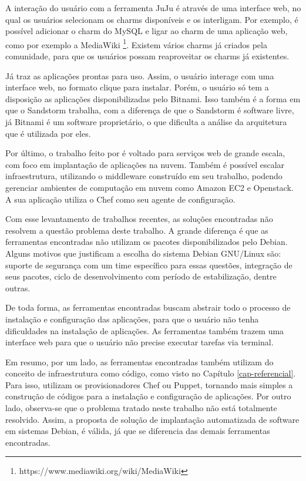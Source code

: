 A interação do usuário com a ferramenta JuJu é através de uma interface web, 
no qual os usuários selecionam os charms disponíveis e os interligam. 
Por exemplo, é possível adicionar o charm do MySQL e ligar ao charm de uma aplicação
web, como por exemplo a MediaWiki \footnote{https://www.mediawiki.org/wiki/MediaWiki}. Existem
vários charms já criados pela comunidade, para que os usuários possam reaproveitar
os charms já existentes.
 
Já  traz as aplicações prontas para uso. Assim, o usuário interage com 
uma interface web, no formato clique para instalar. Porém,
o usuário só tem a disposição as aplicações disponibilizadas pelo Bitnami. Isso
também é a forma em que o Sandstorm trabalha, com a diferença de que o Sandstorm é
software livre, já Bitnami é um software proprietário, o que dificulta a análise da arquitetura
que é utilizada por eles. 

Por último, o trabalho feito por  é voltado
para serviços web de grande escala, com foco em implantação de aplicações na
nuvem. Também é possível escalar infraestrutura, utilizando o middleware construído 
em seu trabalho, podendo gerenciar ambientes de computação em nuvem como Amazon EC2 e 
Openstack. A sua aplicação utiliza o Chef como seu agente de configuração.

Com esse levantamento de trabalhos recentes, as soluções encontradas não resolvem 
a questão problema deste trabalho. A grande diferença é que as ferramentas 
encontradas não utilizam os pacotes disponibilizados pelo Debian. Alguns motivos
que justificam a escolha do sistema Debian GNU/Linux são: suporte de segurança
com um time específico para essas questões, integração de seus pacotes, ciclo de desenvolvimento 
com período de estabilização, dentre outras. 

De toda forma, as ferramentas encontradas buscam
abstrair todo o processo de instalação e configuração das aplicações, para que o
usuário não tenha dificuldades na instalação de aplicações. As ferramentas também
trazem uma interface web para que o usuário não precise executar tarefas via terminal.

Em resumo, por um lado, as ferramentas encontradas também utilizam do conceito de
infraestrutura como código, como visto no Capítulo \ref{cap-referencial}. Para
isso, utilizam os provisionadores Chef ou Puppet, tornando mais simples a
construção de códigos para a instalação e configuração de aplicações. Por outro lado, 
observa-se que o problema tratado neste trabalho não está totalmente resolvido. Assim, 
a proposta de solução de implantação automatizada de software em sistemas Debian, é válida, 
já que se diferencia das demais ferramentas encontradas.

